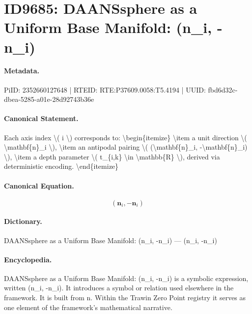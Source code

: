 \section*{ID9685: DAANSsphere as a Uniform Base Manifold: (n\_i, -n\_i)}
\paragraph{Metadata.}
PiID: 2352660127648 | RTEID: RTE:P37609.0058:T5.4194 | UUID: fbd6d32c-dbea-5285-a01e-28d92743b36e

\paragraph{Canonical Statement.}
Each axis index \textbackslash{}( i \textbackslash{}) corresponds to: \textbackslash{}begin\{itemize\} \textbackslash{}item a unit direction \textbackslash{}( \textbackslash{}mathbf\{n\}\_i \textbackslash{}), \textbackslash{}item an antipodal pairing \textbackslash{}( (\textbackslash{}mathbf\{n\}\_i, -\textbackslash{}mathbf\{n\}\_i) \textbackslash{}), \textbackslash{}item a depth parameter \textbackslash{}( t\_\{i,k\} \textbackslash{}in \textbackslash{}mathbb\{R\} \textbackslash{}), derived via deterministic encoding. \textbackslash{}end\{itemize\}

\paragraph{Canonical Equation.}
\[
(\mathbf{n}_i, -\mathbf{n}_i)
\]

\paragraph{Dictionary.}
DAANSsphere as a Uniform Base Manifold: (n\_i, -n\_i) — (n\_i, -n\_i)

\paragraph{Encyclopedia.}
DAANSsphere as a Uniform Base Manifold: (n\_i, -n\_i) is a symbolic expression, written (n\_i, -n\_i). It introduces a symbol or relation used elsewhere in the framework. It is built from n. Within the Trawin Zero Point registry it serves as one element of the framework's mathematical narrative.
